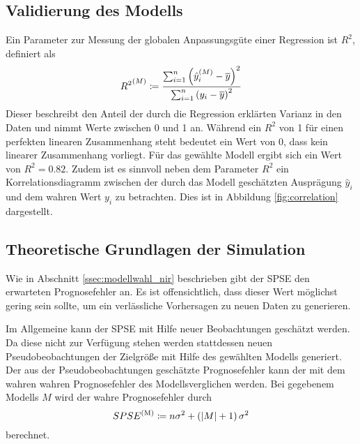 	\subsection{Validierung des Modells}
	\label{ssec:model-validation}
	   Ein Parameter zur Messung der globalen Anpassungsgüte einer Regression ist $R^2$, definiert als \cite{Lang2007}
		\[
			{R^2}^{(M)} \coloneqq \frac {\sum_{i=1}^n \left( \hat{y}^{(M)}_i - \overline{y} \right)^2}{\sum_{i=1}^n \left( y_i - \overline{y} \right)^2}
		\]
		Dieser beschreibt den Anteil der durch die Regression erklärten Varianz in den Daten und nimmt Werte zwischen 0 und 1 an.
		Während ein $R^2$ von 1 für einen perfekten linearen Zusammenhang steht bedeutet ein Wert von 0, dass kein linearer Zusammenhang vorliegt.
		Für das gewählte Modell ergibt sich ein Wert von $R^2 =  0.82$.
		Zudem ist es sinnvoll neben dem Parameter $R^2$ ein Korrelationsdiagramm zwischen der durch das Modell geschätzten Ausprägung $\hat{y}_i$ und dem wahren Wert $y_i$ zu betrachten. Dies ist in Abbildung \ref{fig:correlation} dargestellt.



	\subsection{Theoretische Grundlagen der Simulation}
	\label{ssec:Theoretische Grundlagen der Simulation}

        Wie in Abschnitt \ref{ssec:modellwahl_nir} beschrieben gibt der SPSE den erwarteten Prognosefehler an.
        Es ist offensichtlich, dass dieser Wert möglichst gering sein sollte, um ein verlässliche Vorhersagen zu neuen Daten zu generieren.

        Im Allgemeine kann der SPSE mit Hilfe neuer Beobachtungen geschätzt werden.\cite{Schumacher.2019}
        Da diese nicht zur Verfügung stehen werden stattdessen neuen Pseudobeobachtungen der Zielgröße mit Hilfe des gewählten Modells generiert.
        Der aus der Pseudobeobachtungen geschätzte Prognosefehler kann der mit dem wahren wahren Prognosefehler des Modellsverglichen werden.
        Bei gegebenem Modells $M$ wird der wahre Prognosefehler durch
        \[
            SPSE^{\mathrm{(M)}} \coloneqq  n \sigma^2 + \left( \left\vert M \right\vert+1 \right) \sigma^2
        \]
        berechnet.

